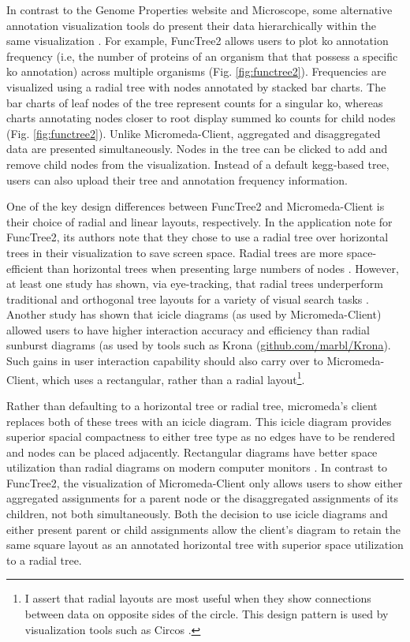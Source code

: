 In contrast to the Genome Properties website and Microscope, some alternative 
annotation visualization tools do present their data hierarchically within the 
same visualization \cite{darzi2019functree2}. For example, FuncTree2 
\cite{darzi2019functree2} allows users to plot \gls{ko}  annotation 
\cite{mao2005automated,kanehisa2011kegg} frequency (i.e, the number of proteins 
of an organism that that possess a specific \gls{ko}  annotation) across 
multiple organisms (Fig. \ref{fig:functree2}). Frequencies are visualized using 
a radial tree with nodes annotated by stacked bar charts. The bar charts of leaf 
nodes of the tree represent counts for a singular \gls{ko}, whereas charts 
annotating nodes closer to root display summed \gls{ko}  counts for child nodes 
(Fig. \ref{fig:functree2}). Unlike Micromeda-Client, aggregated and 
disaggregated data are presented simultaneously. Nodes in the tree can be clicked 
to add and remove child nodes from the visualization. Instead of a default 
\gls{kegg}-based tree, users can also upload their tree and annotation frequency 
information.

One of the key design differences between FuncTree2 and Micromeda-Client is 
their choice of radial and linear layouts, respectively. In the application note 
for FuncTree2, its authors note that they chose to use a radial tree over 
horizontal trees in their visualization to save screen space. Radial trees are 
more space-efficient than horizontal trees when presenting large numbers of 
nodes \cite{burch2011evaluation}. However, at least one study has shown, via 
eye-tracking, that radial trees underperform traditional and orthogonal tree 
layouts for a variety of visual search tasks \cite{burch2011evaluation}. Another 
study has shown that icicle diagrams (as used by Micromeda-Client) allowed users 
to have higher interaction accuracy and efficiency \cite{muramalla2017radial} 
than radial sunburst diagrams (as used by tools such as Krona 
\cite{ondov2011interactive} 
(\href{http://github.com/marbl/Krona}{github.com/marbl/Krona}).
Such gains in user interaction capability should also carry over to 
Micromeda-Client, which uses a rectangular, rather than a radial 
layout\footnote{I assert that radial layouts are most useful when they show 
connections between data on opposite sides of the circle. This design pattern is 
used by visualization tools such as Circos \cite{krzywinski2009circos}.}.

Rather than defaulting to a horizontal tree or radial tree, micromeda's client 
replaces both of these trees with an icicle diagram. This icicle diagram 
provides superior spacial compactness to either tree type as no edges have to be 
rendered and nodes can be placed adjacently. Rectangular diagrams have better 
space utilization than radial diagrams on modern computer monitors 
\cite{muramalla2017radial}. In contrast to FuncTree2, the visualization of 
Micromeda-Client only allows users to show either aggregated assignments for a 
parent node or the disaggregated assignments of its children, not both 
simultaneously. Both the decision to use icicle diagrams and either present 
parent or child assignments allow the client's diagram to retain the same square 
layout as an annotated horizontal tree with superior space utilization to a 
radial tree. 

